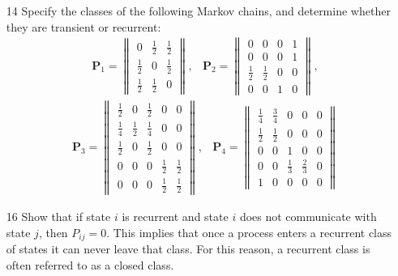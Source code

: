 \documentclass[en,hazy,blue,12pt,device = pad]{elegantnote}
\begin{document}
\begin{enumerate}
    \item[14] Specify the classes of the following Markov chains, and determine whether they are transient or recurrent:
    \begin{align*}
        &\mathbf{P}_1=\left\|\begin{array}{ccc}
        0 & \frac{1}{2} & \frac{1}{2} \\
        \frac{1}{2} & 0 & \frac{1}{2} \\
        \frac{1}{2} & \frac{1}{2} & 0
        \end{array}\right\|,
        &\mathbf{P}_2=\left\|\begin{array}{llll}
        0 & 0 & 0 & 1 \\
        0 & 0 & 0 & 1 \\
        \frac{1}{2} & \frac{1}{2} & 0 & 0 \\
        0 & 0 & 1 & 0
        \end{array}\right\|,
    \end{align*}
    \begin{align*}
        &\mathbf{P}_3=\left\|\begin{array}{lllll}
        \frac{1}{2} & 0 & \frac{1}{2} & 0 & 0 \\
        \frac{1}{4} & \frac{1}{2} & \frac{1}{4} & 0 & 0 \\
        \frac{1}{2} & 0 & \frac{1}{2} & 0 & 0 \\
        0 & 0 & 0 & \frac{1}{2} & \frac{1}{2} \\
        0 & 0 & 0 & \frac{1}{2} & \frac{1}{2}
        \end{array}\right\|,
        &\mathbf{P}_4=\left\|\begin{array}{|ccccc}
        \frac{1}{4} & \frac{3}{4} & 0 & 0 & 0 \\
        \frac{1}{2} & \frac{1}{2} & 0 & 0 & 0 \\
        0 & 0 & 1 & 0 & 0 \\
        0 & 0 & \frac{1}{3} & \frac{2}{3} & 0 \\
        1 & 0 & 0 & 0 & 0
        \end{array}\right\|
    \end{align*}
    \begin{tcolorbox}
        \sol


    \end{tcolorbox}

    \item[16] Show that if state \(i\) is recurrent and state \(i\) does not communicate with state \(j\), then \(P_{i j}=0\). This implies that once a process enters a recurrent class of states it can never leave that class. For this reason, a recurrent class is often referred to as a closed class.
    
    \begin{tcolorbox}
        \sol


    \end{tcolorbox}
\end{enumerate}
\end{document}
